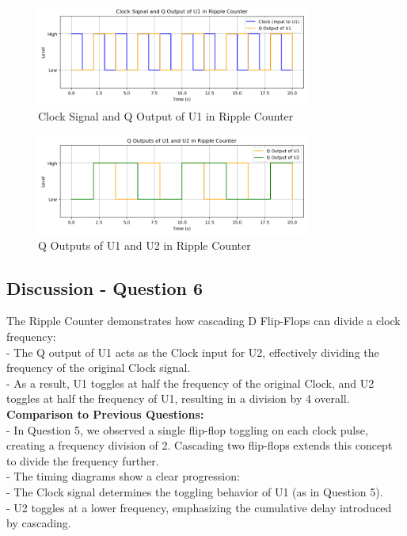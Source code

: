 \documentclass{article}
\begin{document}
    \begin{figure}[H]
        \centering
        \includegraphics[width=0.8\textwidth]{./img/Lab 11/11_6_2.png}  
        \caption{Clock Signal and Q Output of U1 in Ripple Counter}
        \label{fig:Clock_U1_Ripple}
    \end{figure}

    \begin{figure}[H]
        \centering
        \includegraphics[width=0.8\textwidth]{./img/Lab 11/11_6_3.png} 
        \caption{Q Outputs of U1 and U2 in Ripple Counter}
        \label{fig:Q_Outputs_Ripple}
    \end{figure}

    \subsection*{\textbf{Discussion - Question 6}}
    The Ripple Counter demonstrates how cascading D Flip-Flops can divide a clock frequency: \\
    - The Q output of U1 acts as the Clock input for U2, effectively dividing the frequency of the original Clock signal. \\
    - As a result, U1 toggles at half the frequency of the original Clock, and U2 toggles at half the frequency of U1, resulting in a division by 4 overall. \\

    \textbf{Comparison to Previous Questions:} \\
    - In Question 5, we observed a single flip-flop toggling on each clock pulse, creating a frequency division of 2. Cascading two flip-flops extends this concept to divide the frequency further. \\
    - The timing diagrams show a clear progression: \\
        - The Clock signal determines the toggling behavior of U1 (as in Question 5). \\
        - U2 toggles at a lower frequency, emphasizing the cumulative delay introduced by cascading. \\
\end{document}
